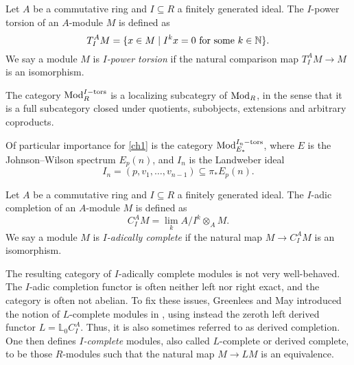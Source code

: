 \begin{definition}
    \label{def:I-power-torsion-module}
    Let $A$ be a commutative ring and $I\subseteq R$ a finitely generated ideal. The $I$-power torsion of an $A$-module $M$ is defined as
    \[T_I^A M = \{x\in M \mid I^k x = 0 \text{ for some } k\in \mathbb{N}\}.\]
    We say a module $M$ is \emph{$I$-power torsion} if the natural comparison map $T_I^A M\longrightarrow M$ is an isomorphism. 
\end{definition}

\begin{remark}
    The category $\mathrm{Mod}_R^{I-\mathrm{tors}}$ is a localizing subcategry of $\mathrm{Mod}_R$, in the sense that it is a full subcategory closed under quotients, subobjects, extensions and arbitrary coproducts. 
\end{remark}

\begin{remark}
    Of particular importance for \cref{ch1} is the category $\mathrm{Mod}_{E_*}^{I_n-\mathrm{tors}}$, where $E$ is the Johnson--Wilson spectrum $E_p(n)$, and $I_n$ is the Landweber ideal 
    \[I_n = (p, v_1, \ldots, v_{n-1})\subseteq \pi_* E_p(n).\]
\end{remark}

\begin{definition}
    Let $A$ be a commutative ring and $I\subseteq R$ a finitely generated ideal. The $I$-adic completion of an $A$-module $M$ is defined as
    \[C_I^A M = \lim_k A/I^k\otimes_A M.\]
    We say a module $M$ is \emph{$I$-adically complete} if the natural map $M\longrightarrow C_I^A M$ is an isomorphism. 
\end{definition}

\begin{remark}
    \label{ch0:rm:I-complete-vs-I-adically-complete}
    The resulting category of $I$-adically complete modules is not very well-behaved. The $I$-adic completion functor is often neither left nor right exact, and the category is often not abelian. To fix these issues, Greenlees and May introduced the notion of $L$-complete modules in \cite{greenlees-may_92}, using instead the zeroth left derived functor $L=\mathbb{L}_0 C_I^A$. Thus, it is also sometimes referred to as derived completion. One then defines \emph{$I$-complete} modules, also called $L$-complete or derived complete, to be those $R$-modules such that the natural map $M\longrightarrow L M$ is an equivalence. 
\end{remark}

